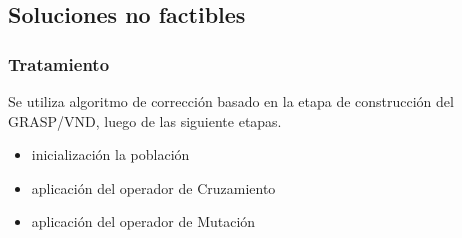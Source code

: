 % 
%	       



\subsection{Soluciones no factibles}
\begin{frame}\frametitle{Tratamiento}
  Se utiliza algoritmo de corrección basado en la etapa de construcción del GRASP/VND, luego de las siguiente etapas.\\
  \begin{itemize}
  \item inicialización la población
  \item aplicación del operador de Cruzamiento
  \item aplicación del operador de Mutación
  \end{itemize}  
\end{frame}

